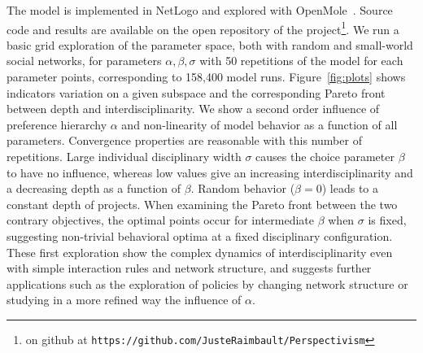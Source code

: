 The model is implemented in NetLogo and explored with OpenMole~\cite{reuillon2013openmole}. Source code and results are available on the open repository of the project\footnote{on github at \texttt{https://github.com/JusteRaimbault/Perspectivism}}. We run a basic grid exploration of the parameter space, both with random and small-world social networks, for parameters $\alpha,\beta,\sigma$ with 50 repetitions of the model for each parameter points, corresponding to 158,400 model runs. Figure~\ref{fig:plots} shows indicators variation on a given subspace and the corresponding Pareto front between depth and interdisciplinarity. We show a second order influence of preference hierarchy $\alpha$ and non-linearity of model behavior as a function of all parameters. Convergence properties are reasonable with this number of repetitions. Large individual disciplinary width $\sigma$ causes the choice parameter $\beta$ to have no influence, whereas low values give an increasing interdisciplinarity and a decreasing depth as a function of $\beta$. Random behavior ($\beta = 0$) leads to a constant depth of projects. When examining the Pareto front between the two contrary objectives, the optimal points occur for intermediate $\beta$ when $\sigma$ is fixed, suggesting non-trivial behavioral optima at a fixed disciplinary configuration. These first exploration show the complex dynamics of interdisciplinarity even with simple interaction rules and network structure, and suggests further applications such as the exploration of policies by changing network structure or studying in a more refined way the influence of $\alpha$.


